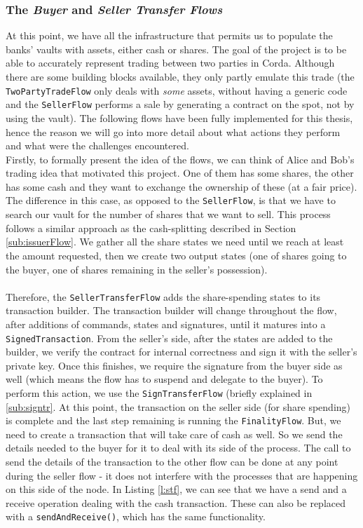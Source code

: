 \documentclass[12pt,twoside]{article}
\begin{document}
\subsubsection{The \textit{Buyer} and \textit{Seller Transfer Flows}}
\label{sub:transfer}
At this point, we have all the infrastructure that permits us to populate the banks' vaults with assets, either cash or shares. The goal of the project is to be able to accurately represent trading between two parties in Corda. Although there are some building blocks available, they only partly emulate this trade (the \verb|TwoPartyTradeFlow| only deals with \textit{some} assets, without having a generic code and the \verb|SellerFlow| performs a sale by generating a contract on the spot, not by using the vault). The following flows have been fully implemented for this thesis, hence the reason we will go into more detail about what actions they perform and what were the challenges encountered.
\\
Firstly, to formally present the idea of the flows, we can think of Alice and Bob's trading idea that motivated this project. One of them has some shares, the other has some cash and they want to exchange the ownership of these (at a fair price). The difference in this case, as opposed to the \verb|SellerFlow|, is that we have to search our vault for the number of shares that we want to sell. This process follows a similar approach as the cash-splitting described in Section \ref{sub:issuerFlow}. We gather all the share states we need until we reach at least the amount requested, then we create two output states (one of shares going to the buyer, one of shares remaining in the seller's possession). 
\\ \\
Therefore, the \verb|SellerTransferFlow| adds the share-spending states to its transaction builder. The transaction builder will change throughout the flow, after additions of commands, states and signatures, until it matures into a \verb|SignedTransaction|. From the seller's side, after the states are added to the builder, we verify the contract for internal correctness and sign it with the seller's private key. Once this finishes, we require the signature from the buyer side as well (which means the flow has to suspend and delegate to the buyer). To perform this action, we use the \verb|SignTransferFlow| (briefly explained in \ref{sub:signtr}. At this point, the transaction on the seller side (for share spending) is complete and the last step remaining is running the \verb|FinalityFlow|. But, we need to create a transaction that will take care of cash as well. So we send the details needed to the buyer for it to deal with its side of the process. The call to send the details of the transaction to the other flow can be done at any point during the seller flow - it does not interfere with the processes that are happening on this side of the node. In Listing \ref{l:stf}, we can see that we have a send and a receive operation dealing with the cash transaction. These can also be replaced with a \verb|sendAndReceive()|, which has the same functionality.
\end{document}
